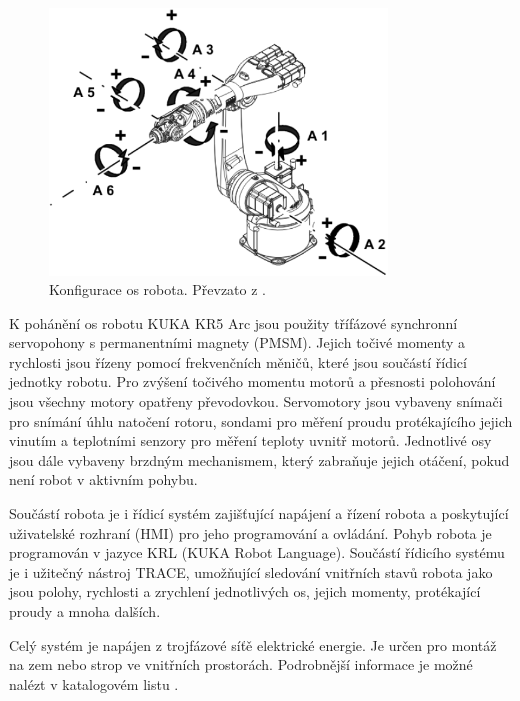 \begin{figure}[ht]
\includegraphics[width=0.8\textwidth]{kuka_kr5_axes}
\caption{Konfigurace os robota. Převzato z \cite{kuka_datasheet_url}.}
\label{kuka_kr5_axes_pic}
\end{figure}

K pohánění os robotu KUKA KR5 Arc jsou použity třífázové synchronní servopohony s permanentními magnety (PMSM). Jejich točivé momenty a rychlosti jsou řízeny pomocí frekvenčních měničů, které jsou součástí řídicí jednotky robotu. Pro zvýšení točivého momentu motorů a přesnosti polohování jsou všechny motory opatřeny převodovkou. Servomotory jsou vybaveny snímači pro snímání úhlu natočení rotoru, sondami pro měření proudu protékajícího jejich vinutím a teplotními senzory pro měření teploty uvnitř motorů. Jednotlivé osy jsou dále vybaveny brzdným mechanismem, který zabraňuje jejich otáčení, pokud není robot v aktivním pohybu. 

Součástí robota je i řídicí systém zajišťující napájení a řízení robota a poskytující uživatelské rozhraní (HMI) pro jeho programování a ovládání. Pohyb robota je programován v jazyce KRL (KUKA Robot Language). Součástí řídicího systému je i užitečný nástroj TRACE, umožňující sledování vnitřních stavů robota jako jsou polohy, rychlosti a zrychlení jednotlivých os, jejich momenty, protékající proudy a mnoha dalších. 

Celý systém je napájen z trojfázové síťě elektrické energie. Je určen pro montáž na zem nebo strop ve vnitřních prostorách. Podrobnější informace je možné nalézt v katalogovém listu \cite{kuka_datasheet_url}.